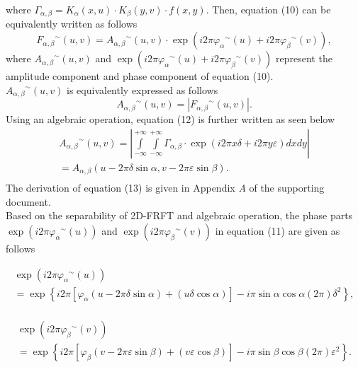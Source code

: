 \documentclass[journal]{IEEEtran}
\begin{document}
where ${\Gamma _{\alpha ,\beta }} = {K_\alpha }(x,u)\cdot{K_\beta }(y,v)\cdot f(x,y)$. Then, equation (10) can be equivalently written as follows
\begin{equation}
 {F_{\alpha ,\beta }}^\sim(u,v)  = {A_{\alpha ,\beta }}^\sim(u,v)\cdot\exp (i2\pi {\varphi _\alpha }^\sim(u) + i2\pi {\varphi _\beta }^\sim(v)),
\end{equation}
where ${A_{\alpha ,\beta }}^ \sim (u,v)$ and $\exp (i2\pi {\varphi _\alpha }^ \sim (u)+ i2\pi {\varphi _\beta }^ \sim (v))$ represent the amplitude component and phase component of equation (10).\\\indent ${A_{\alpha ,\beta }}^ \sim (u,v)$ is equivalently expressed as follows
\begin{equation}
{A_{\alpha ,\beta }}^\sim(u,v) = \left| {{F_{\alpha ,\beta }}^\sim(u,v)} \right|.
\end{equation}
Using an algebraic operation, equation (12) is further written as seen below
\begin{equation}
\begin{array}{l}
 {A_{\alpha ,\beta }}^\sim(u,v) = \left| {\int\limits_{ - \infty }^{ + \infty } {\int\limits_{ - \infty }^{ + \infty } {{\Gamma _{\alpha ,\beta }}\cdot\exp (i2\pi x\delta  + i2\pi y\varepsilon )dx} } dy} \right| \\
  = {A_{\alpha ,\beta }}(u - 2\pi \delta \sin \alpha ,v - 2\pi \varepsilon \sin \beta ). \\
 \end{array}
\end{equation}
The derivation of equation (13) is given in Appendix \emph{A} of the supporting document.\\\indent
Based on the separability of 2D-FRFT and algebraic operation, the phase parts $\exp (i2\pi {\varphi _\alpha }^ \sim (u))$ and $\exp(i2\pi {\varphi _\beta }^ \sim (v))$ in equation (11) are given as follows
\begin{small}
\begin{equation}
\begin{array}{l}
 \exp (i2\pi {\varphi _\alpha }^\sim(u)) \\
  = \exp \left\{ {i2\pi [{\varphi _\alpha }(u - 2\pi \delta \sin \alpha ) + (u\delta \cos \alpha )] - i\pi \sin \alpha \cos \alpha (2\pi ){\delta ^2}} \right\}, \\
 \end{array}
\end{equation}
\end{small}
\begin{small}
\begin{equation}
\begin{array}{l}
 \exp (i2\pi {\varphi _\beta }^\sim(v)) \\
  = \exp \left\{ {i2\pi [{\varphi _\beta }(v - 2\pi \varepsilon \sin \beta ) + (v\varepsilon \cos \beta )] - i\pi \sin \beta \cos \beta (2\pi ){\varepsilon ^2}} \right\}. \\
 \end{array}
\end{equation}
\end{small}
\end{document}
